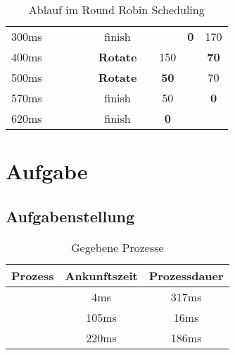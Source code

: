 \documentclass{article}
\begin{document}
\begin{table}[!h]
\begin{tabular}{c|cccc|c|cccc}
        300ms                                   & \PThree{}                                       & \POne{}         &                 &                 & \PTwo{} finish   &                   &                  & \textbf{0}       & 170                \\
        400ms                                   & \POne{}                                         & \PThree{}       &                 &                 & \textbf{Rotate}  &                   & 150              &                  & \textbf{70}        \\
        500ms                                   & \PThree{}                                       & \POne{}         &                 &                 & \textbf{Rotate}  &                   & \textbf{50}      &                  & 70                 \\
        570ms                                   & \POne{}                                         &                 &                 &                 & \PThree{} finish &                   & 50               &                  & \textbf{0}         \\
        620ms                                   &                                                 &                 &                 &                 & \POne{} finish   &                   & \textbf{0}       &                  &
    \end{tabular}
    \caption{Ablauf im Round Robin Scheduling}
\end{table}

\section{Aufgabe}

\subsection{Aufgabenstellung}

\begin{table}[!h]
    \begin{tabular}{c|c|c}
        \textbf{Prozess} & \textbf{Ankunftszeit} & \textbf{Prozessdauer} \\
        \hline{}
        \PZero{}         & 4ms                   & 317ms                 \\
        \POne{}          & 105ms                 & 16ms                  \\
        \PTwo{}          & 220ms                 & 186ms
    \end{tabular}
    \caption{Gegebene Prozesse}
\end{table}
\end{document}
